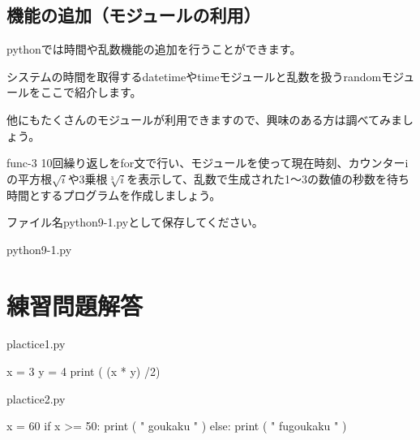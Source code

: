 \documentclass[11pt,a4paper,dvipdfmx,titlepage]{jsreport}
\begin{document}
\section{機能の追加（モジュールの利用）}
pythonでは時間や乱数機能の追加を行うことができます。

システムの時間を取得するdatetimeやtimeモジュールと乱数を扱うrandomモジュールをここで紹介します。

他にもたくさんのモジュールが利用できますので、興味のある方は調べてみましょう。
\begin{pabox}{func-3}
10回繰り返しをfor文で行い、モジュールを使って現在時刻、カウンターiの平方根$\sqrt{　i　}$や3乗根$\sqrt[3]{　i　}$を表示して、乱数で生成された1～3の数値の秒数を待ち時間とするプログラムを作成しましょう。

ファイル名python9-1.pyとして保存してください。
\begin{codebox}{python9-1.py}
\end{codebox}
\end{pabox}





\newpage
\chapter{練習問題解答}


\begin{ansbox}{plactice1.py}
\begin{listing}{1}
x = 3
y = 4
print ( (x * y) /2)
\end{listing}
\end{ansbox}

\begin{ansbox}{plactice2.py}
\begin{listing}{1}
x = 60
if x >= 50:
    print ( " goukaku " ) 
else:
    print ( " fugoukaku " )
\end{listing}
\end{ansbox}
\end{document}
